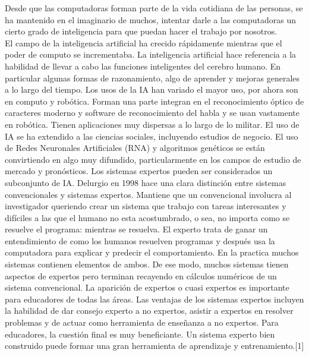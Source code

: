 \documentclass[runningheads,a4paper]{llncs}
\begin{document}
Desde que las computadoras forman parte de la vida cotidiana de las personas, se ha mantenido en el imaginario de muchos, intentar darle a las computadoras un cierto grado de inteligencia para que puedan hacer el trabajo por nosotros.\\

El campo de la inteligencia artificial ha crecido rápidamente mientras que el poder de computo se incrementaba. La inteligencia artificial hace referencia a la habilidad de llevar a cabo las funciones inteligentes del cerebro humano. En particular algunas formas de razonamiento, algo de aprender y mejoras generales a lo largo del tiempo. Los usos de la IA han variado el mayor uso, por ahora son en computo y robótica. Forman una parte integran en el reconocimiento óptico de caracteres moderno y software de reconocimiento del habla y se usan vastamente en robótica. Tienen aplicaciones muy dispersas a lo largo de lo militar. El uso de IA se ha extendido a las ciencias sociales, incluyendo estudios de negocio. El uso de Redes Neuronales Artificiales (RNA) y algoritmos genéticos se están convirtiendo en algo muy difundido, particularmente en los campos de estudio de mercado y pronósticos.\cite{IN1}
Los sistemas expertos pueden ser considerados un subconjunto de IA. Delurgio en 1998 hace una clara distinción entre sistemas convencionales y sistemas expertos. Mantiene que un convencional involucra al investigador queriendo crear un sistema que trabajo con tareas interesantes y difíciles a las que el humano no esta acostumbrado, o sea, no importa como se resuelve el programa: mientras se resuelva. El experto trata de ganar un entendimiento de como los humanos resuelven programas y después usa la computadora para explicar y predecir el comportamiento. En la practica muchos sistemas contienen elementos de ambos. De ese modo, muchos sistemas tienen aspectos de expertos pero terminan recayendo en cálculos numéricos de un sistema convencional.
La aparición de expertos o cuasi expertos es importante para educadores de todas las áreas. Las ventajas de los sistemas expertos incluyen la habilidad de dar consejo experto a no expertos, asistir a expertos en resolver problemas y de actuar como herramienta de enseñanza a no expertos\cite{IN2}. Para educadores, la cuestión final es muy beneficiante. Un sistema experto bien construido puede formar una gran herramienta de aprendizaje y entrenamiento.[1]
\end{document}
